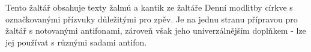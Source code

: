 \documentclass[a4paper]{article}
\begin{document}


\titulniStrankaSvazkuAntifonare

Tento žaltář obsahuje texty žalmů a kantik ze žaltáře
Denní modlitby církve s označkovanými přízvuky důležitými
pro zpěv.
Je na jednu stranu přípravou pro žaltář s notovanými antifonami,
zároveň však jeho univerzálnějším doplňkem - lze jej používat
s různými sadami antifon.



\nesporyI


  
\clearpage
\tirazSvazkuAntifonare
\end{document}
